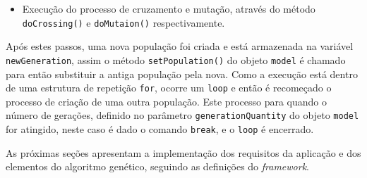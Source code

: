 \begin{itemize}
\begin{itemize}
		\item Execução do processo de cruzamento e mutação, através do método
		\texttt{doCrossing()} e \texttt{doMutaion()} respectivamente.
		
		
	\end{itemize}
	
	\par Após estes passos, uma nova população foi criada e está
	armazenada na variável \texttt{newGen\-eration}, assim o método
	\texttt{setPopulation()} do objeto \texttt{model} é chamado para então substituir
	a antiga população pela nova. Como a execução está dentro de uma estrutura de repetição
	\texttt{for}, ocorre um \texttt{loop} e então é recomeçado o processo de
	criação de uma outra população. Este processo para quando o número de gerações, 
	definido no parâmetro \texttt{generationQuantity} do objeto \texttt{model}
	for atingido, neste caso é dado o comando \texttt{break}, e o \texttt{loop} é encerrado.
	
	
	
	
\end{itemize}

\par As próximas seções apresentam a implementação dos requisitos da aplicação
e dos elementos do algoritmo genético, seguindo as definições do \textit{framework}.

